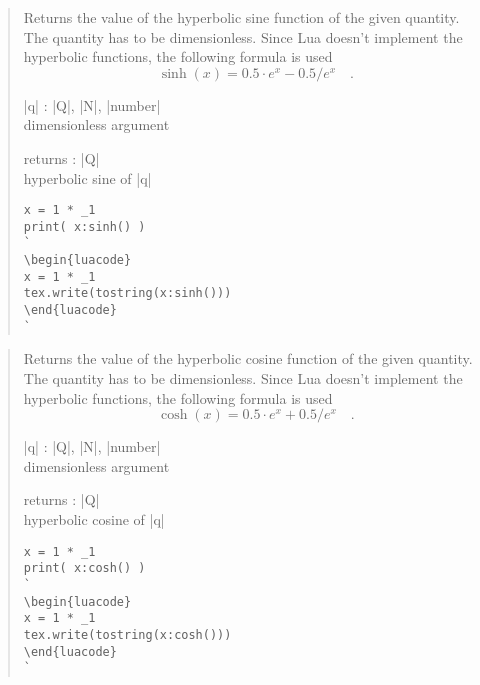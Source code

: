 \documentclass{ltxdoc}
\begin{document}
\begin{quote}
  Returns the value of the hyperbolic sine function of the given quantity. The quantity has to be dimensionless. Since Lua doesn't implement the hyperbolic functions, the following formula is used 
  $$
    \sinh(x) = 0.5 \cdot e^x - 0.5 / e^x  \quad.
  $$

  \begin{description}
  \item |q| : |Q|, |N|, |number|\\
    dimensionless argument

  \item returns : |Q|\\
    hyperbolic sine of |q|
  \end{description}


\begin{lstlisting}
x = 1 * _1
print( x:sinh() )
`
\begin{luacode}
x = 1 * _1
tex.write(tostring(x:sinh()))
\end{luacode}
`
\end{lstlisting}

\end{quote}



\begin{quote}
  Returns the value of the hyperbolic cosine function of the given quantity. The quantity has to be dimensionless. Since Lua doesn't implement the hyperbolic functions, the following formula is used 
  $$
    \cosh(x) = 0.5 \cdot e^x + 0.5 / e^x  \quad.
  $$

  \begin{description}
  \item |q| : |Q|, |N|, |number|\\
    dimensionless argument

  \item returns : |Q|\\
    hyperbolic cosine of |q|
  \end{description}

\begin{lstlisting}
x = 1 * _1
print( x:cosh() )
`
\begin{luacode}
x = 1 * _1
tex.write(tostring(x:cosh()))
\end{luacode}
`
\end{lstlisting}

\end{quote}
\end{document}
